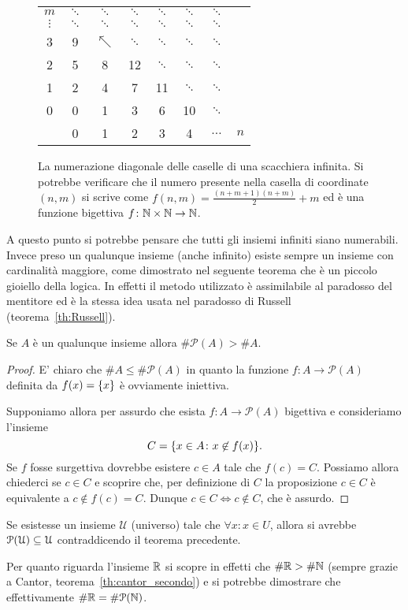 \begin{figure}
  \begin{tabular}{c|ccccccc}
   $m$ & $\ddots$ & $\ddots$ & $\ddots$ & $\ddots$ & $\ddots$ & $\ddots$\\
   $\vdots$ & $\ddots$ & $\ddots$ & $\ddots$ & $\ddots$ & $\ddots$ & $\ddots$\\
   3 & 9 & $\nwarrow$ & $\ddots$  & $\ddots$ & $\ddots$ & $\ddots$\\
   2 & 5 & 8 & 12 & $\ddots$  & $\ddots$ & $\ddots$\\
   1 & 2 & 4 & 7 & 11 & $\ddots$  & $\ddots$\\
   0 & 0 & 1 & 3 & 6 & 10 & $\ddots$ \\ \hline
     & 0 & 1 & 2 & 3 & 4 & $\dots$ & $n$
  \end{tabular}
  \caption{
    La numerazione diagonale delle caselle
    di una scacchiera infinita. Si potrebbe verificare
    che il numero presente nella casella di coordinate $(n,m)$
    si scrive come $f(n,m) = \frac{(n+m+1)(n+m)}{2}+m$
    ed è una funzione bigettiva $f\colon \NN\times\NN \to\NN$.}
  \label{fig:cantor1}
\end{figure}

A questo punto si potrebbe pensare che
tutti gli insiemi infiniti siano numerabili.
Invece preso un qualunque insieme (anche infinito)
esiste sempre un insieme con cardinalità maggiore,
come dimostrato nel seguente teorema che è un piccolo gioiello della logica.
In effetti il metodo utilizzato è assimilabile al paradosso del mentitore 
ed è la stessa idea usata nel paradosso di Russell (teorema~\ref{th:Russell}).
%
%
\begin{theorem}[Cantor]%
%
%
\label{th:Cantor}%
  Se $A$ è un qualunque insieme allora $\# \mathcal P(A) > \# A$.
\end{theorem}
%
\begin{proof}
  E' chiaro che $\# A \le \#\mathcal P(A)$ in quanto 
  la funzione $f\colon A \to \mathcal P(A)$ definita da $f(x)=\ENCLOSE{x}$
  è ovviamente iniettiva.

  Supponiamo allora per assurdo che esista $f\colon A\to \mathcal P(A)$
  bigettiva e consideriamo l'insieme 
  \[
    C = \ENCLOSE{x\in A \colon x\not\in f(x)}.  
  \]
  Se $f$ fosse surgettiva dovrebbe esistere $c\in A$ tale che $f(c) = C$.
  Possiamo allora chiederci se $c\in C$ e scoprire che, 
  per definizione di $C$ la proposizione $c\in C$ è equivalente 
  a $c\not\in f(c) = C$. 
  Dunque $c\in C \iff c\not\in C$, che è assurdo.
\end{proof}
%
\begin{corollary}
  Se esistesse un insieme $\mathcal U$ (universo) 
  tale che $\forall x\colon x \in U$, allora 
  si avrebbe $\mathcal \P(\mathcal U) \subset \mathcal U$
  contraddicendo il teorema precedente.
\end{corollary}
%
Per quanto riguarda l'insieme $\RR$ si
scopre in effetti che $\#\RR > \#\NN$
(sempre grazie a Cantor, teorema~\ref{th:cantor_secondo})
e si potrebbe dimostrare che effettivamente $\#\RR = \#\mathcal P(\NN)$.

